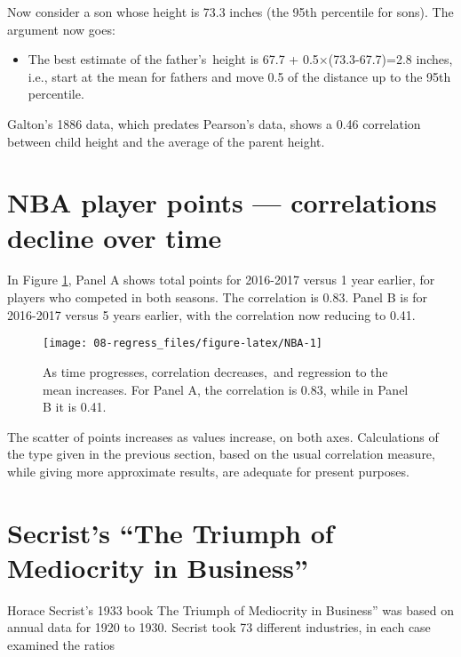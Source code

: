 \documentclass[
  10ptls,
  b5paper]{book}
\providecommand{\tightlist}{%
  \setlength{\itemsep}{0pt}\setlength{\parskip}{0pt}}
\begin{document}
Now consider a son whose height is 73.3 inches (the 95th percentile for sons). The argument now goes:

\begin{itemize}
\tightlist
\item
  The best estimate of the father's~height is 67.7 + 0.5\(\times\)(73.3-67.7)=2.8 inches, i.e., start at the mean for fathers and move 0.5 of the distance up to the 95th percentile.
\end{itemize}

Galton's 1886 data, which predates Pearson's data, shows a 0.46 correlation between child height and the average of the parent height.

\hypertarget{nba-player-points-correlations-decline-over-time}{%
\section{NBA player points --- correlations decline over time}\label{nba-player-points-correlations-decline-over-time}}

In Figure \ref{fig:NBA}, Panel A shows total points for 2016-2017 versus 1 year earlier, for players who competed in both seasons. The correlation is 0.83. Panel B is for 2016-2017 versus 5 years earlier, with the correlation now reducing to 0.41.

\begin{figure}[H]

{\centering \texttt{[image: 08-regress\_files/figure-latex/NBA-1]} 

}

\caption{As time progresses, correlation decreases, and regression to the mean increases.  For Panel A, the correlation is 0.83, while in Panel B it is 0.41.}\label{fig:NBA}
\end{figure}

The scatter of points increases as values increase, on both axes. Calculations of the type given in the previous section, based on the usual correlation measure, while giving more approximate results, are adequate for present purposes.

\hypertarget{secrists-the-triumph-of-mediocrity-in-business}{%
\section{Secrist's ``The Triumph of Mediocrity in Business''}\label{secrists-the-triumph-of-mediocrity-in-business}}

Horace Secrist's 1933 book The Triumph of Mediocrity in Business'' was based on annual data for 1920 to 1930. Secrist took 73 different industries, in each case examined the ratios
\end{document}
